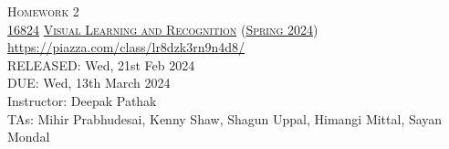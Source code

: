 \documentclass[11pt,addpoints,answers]{exam}
\title{\textsc{\hwName}} %
\author{}
\date{}
\date{}
\numberwithin{equation}{section} %
\numberwithin{figure}{section} %
\numberwithin{table}{section} %
\newcommand{\courseNum}{\href{https://visual-learning.cs.cmu.edu/}{16824}}
\newcommand{\courseName}{\href{https://visual-learning.cs.cmu.edu/}{Visual Learning and Recognition}}
\newcommand{\courseSem}{\href{https://visual-learning.cs.cmu.edu/}{Spring 2024}}
\newcommand{\courseUrl}{\url{https://piazza.com/class/lr8dzk3rn9n4d8/}}
\newcommand{\hwNum}{Homework 2}
\newcommand{\hwTopic}{Generative Modeling}
\newcommand{\outDate}{Wed, 21st Feb 2024}
\newcommand{\dueDate}{Wed, 13th March 2024}
\newcommand{\instructorName}{Deepak Pathak}
\newcommand{\taNames}{Mihir Prabhudesai, Kenny Shaw, Shagun Uppal, Himangi Mittal, Sayan Mondal}
\begin{document}
\section*{}
\begin{center}
  \textsc{\LARGE \hwNum} \\
  \vspace{1em}
  \textsc{\large \courseNum{} \courseName{} (\courseSem)} \\
  \courseUrl\\
  \vspace{1em}
  RELEASED: \outDate \\
  DUE: \dueDate \\
  Instructor: \instructorName \\
  TAs: \taNames
\end{center}
\end{document}
